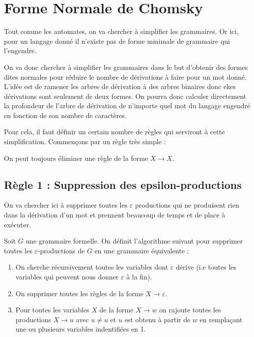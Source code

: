 
\section{Forme Normale de Chomsky}

Tout comme les automates, on va chercher à simplifier les grammaires. 
Or ici, pour un langage donné il n'existe pas de forme minimale de grammaire qui l'engendre.

On va donc chercher à simplifier les grammaires dans le but d'obtenir des formes dites normales 
pour réduire le nombre de dérivations à faire pour un mot donné. L'idée est de ramener les arbres de dérivation 
à des arbres binaires donc ekes dérivations sont seulement de deux formes. 
On pourra donc calculer directement la profondeur de l'arbre de dérivation de n'importe quel mot du langage
engendré en fonction de son nombre de caractères. 

Pour cela, il faut définir un certain nombre de règles qui serviront à cette simplification. 
Commençons par un règle très simple : 

\begin{definition}[Règle 0]
    On peut toujours éliminer une règle de la forme $ X \longrightarrow X$. 
\end{definition}

\subsection{Règle 1 : Suppression des epsilon-productions}

On va chercher ici à supprimer toutes les $\varepsilon$ productions qui ne produisent rien dans la 
dérivation d'un mot et prennent beaucoup de temps et de place à exécuter. 

\begin{definition}
    Soit $G$ une grammaire formelle. On définit l'algorithme suivant pour 
    supprimer toutes les $\varepsilon$-productions de $ G$ en une grammaire équivalente : 
    \begin{enumerate}
        \item On cherche récursivement toutes les variables dont $\varepsilon$ dérive
        (i.e toutes les variables qui peuvent nous donner $\varepsilon$ à la fin). 
        \item On supprimer toutes les règles de la forme $X \longrightarrow \varepsilon$. 
        \item Pour toutes les variables $X$ de la forme $X \longrightarrow w$ 
        on rajoute toutes les productions $X \longrightarrow u$ avec $ u \not = u$ et $u$ est 
        obtenu à partir de $w$ en remplaçant une ou plusieurs variables indentifiées en 1. 
    \end{enumerate}
\end{definition}

